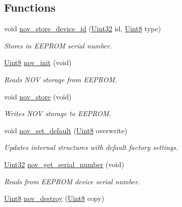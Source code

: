 \subsection*{Functions}
\begin{DoxyCompactItemize}
\item 
void \hyperlink{a00029_a9aa94b184db1bd55b6a4a61a34c14c8d}{nov\+\_\+store\+\_\+device\+\_\+id} (\hyperlink{a00072_aba99025e657f892beb7ff31cecf64653}{Uint32} id, \hyperlink{a00072_af84840501dec18061d18a68c162a8fa2}{Uint8} type)
\begin{DoxyCompactList}\small\item\em Stores in E\+E\+P\+R\+O\+M serial number. \end{DoxyCompactList}\item 
\hyperlink{a00072_af84840501dec18061d18a68c162a8fa2}{Uint8} \hyperlink{a00029_a8ad2f815848f1668763c01ff9d45a01b}{nov\+\_\+init} (void)
\begin{DoxyCompactList}\small\item\em Reads N\+O\+V storage from E\+E\+P\+R\+O\+M. \end{DoxyCompactList}\item 
void \hyperlink{a00029_a90aef186f45a15d94bf0247122194991}{nov\+\_\+store} (void)
\begin{DoxyCompactList}\small\item\em Writes N\+O\+V storage to E\+E\+P\+R\+O\+M. \end{DoxyCompactList}\item 
void \hyperlink{a00029_ada4ee53cb163a9ed3e2b4a5c7192690a}{nov\+\_\+set\+\_\+default} (\hyperlink{a00072_af84840501dec18061d18a68c162a8fa2}{Uint8} overwrite)
\begin{DoxyCompactList}\small\item\em Updates internal structures with default factory settings. \end{DoxyCompactList}\item 
\hyperlink{a00072_aba99025e657f892beb7ff31cecf64653}{Uint32} \hyperlink{a00029_a86b863ea185628aff5a00b4defbbb6e1}{nov\+\_\+get\+\_\+serial\+\_\+number} (void)
\begin{DoxyCompactList}\small\item\em Reads from E\+E\+P\+R\+O\+M device serial number. \end{DoxyCompactList}\item 
\hyperlink{a00072_af84840501dec18061d18a68c162a8fa2}{Uint8} \hyperlink{a00029_aeb181884e4c104cd984afdd6eb2a2782}{nov\+\_\+destroy} (\hyperlink{a00072_af84840501dec18061d18a68c162a8fa2}{Uint8} copy)

\end{DoxyCompactItemize}
